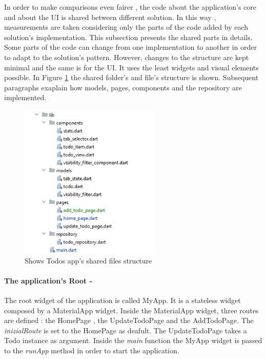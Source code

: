 In order to make comparisons even fairer , the code about the application's core and about the UI is shared between different solution. In this way , measurements are taken considering only the parts of the code added by each solution's implementation. This subsection presents the shared parts in details. Some parts of the code can change from one implementation to another in order to adapt to the solution's pattern. However, changes to the structure are kept minimal and the same is for the UI. It uses the least widgets and visual elements possible. In  Figure \ref{fig:todo_app_shared_folder_structure} the shared folder's and file's structure is shown. Subsequent paragraphs exaplain how models, pages, components and the repository are implemented. 

		
		\begin{figure}[H]
		    \centering
		    \includegraphics[width=0.6\textwidth]{Images/folder_structure.png}
		    \caption{Shows Todos app's shared files structure}
		    \label{fig:todo_app_shared_folder_structure}
		\end{figure}
		
		
		
\paragraph{The application's Root - }
		\label{par:todo_app_application_root}
The root widget of the application is called MyApp.
It is a stateless widget composed by a MaterialApp widget. Inside the MaterialApp widget, three routes are defined : the HomePage , the UpdateTodoPage and the AddTodoPage. The \textit{inizialRoute} is set to the HomePage as deafult. The UpdateTodoPage takes a Todo instance as argument. Inside the \textit{main} function the MyApp widget is passed to the \textit{runApp} method in order to start the application.


